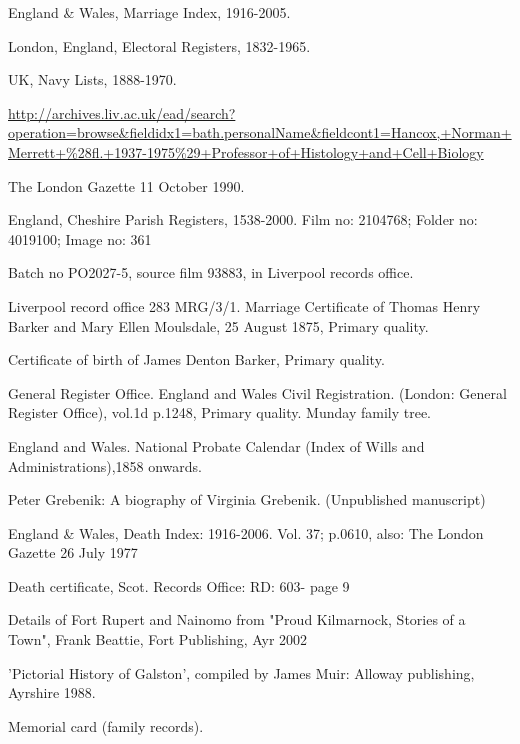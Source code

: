 \begin{thebibliography}{99}
	England \& Wales, Marriage Index, 1916-2005. 
	
	 London, England, Electoral Registers, 1832-1965. 
	 
	 UK, Navy Lists, 1888-1970.
	 
	\url{http://archives.liv.ac.uk/ead/search?operation=browse&fieldidx1=bath.personalName&fieldcont1=Hancox,+Norman+Merrett+\%28fl.+1937-1975\%29+Professor+of+Histology+and+Cell+Biology}

	The London Gazette 11 October 1990. 
	
	England, Cheshire Parish Registers, 1538-2000.
	Film no: 2104768; Folder no: 4019100; Image no: 361

	Batch no PO2027-5, source film 93883, in Liverpool records office.

	Liverpool record office 283 MRG/3/1.
	Marriage Certificate of Thomas Henry Barker and Mary Ellen Moulsdale, 25 August 1875, Primary quality. 
	
	Certificate of birth of James Denton Barker, Primary quality. 
	
	General Register Office. England and Wales Civil Registration. (London: General Register Office), vol.1d p.1248, Primary quality.
	Munday family tree. 
	
	England and Wales. National Probate Calendar (Index of Wills and Administrations),1858 onwards. 
	
	Peter Grebenik: A biography of Virginia Grebenik. (Unpublished manuscript)

	England \& Wales, Death Index: 1916-2006. Vol. 37; p.0610, also:
	The London Gazette 26 July 1977

	Death certificate, Scot. Records Office: RD: 603- page 9

	Details of Fort Rupert and Nainomo from "Proud Kilmarnock, Stories of a Town", Frank Beattie, Fort Publishing, Ayr 2002

	'Pictorial History of Galston', compiled by James Muir: Alloway publishing, Ayrshire 1988.

	 Memorial card (family records).
	 

\end{thebibliography}
